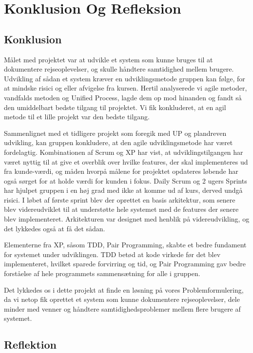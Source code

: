 \chapter{Konklusion Og Refleksion}\label{ch:KonklusionRefleksion}

\section{Konklusion}
Målet med projektet var at udvikle et system som kunne bruges til at dokumentere rejseoplevelser, og skulle håndtere samtidighed mellem brugere. Udvikling af sådan et system kræver en udviklingsmetode gruppen kan følge, for at mindske risici og eller afvigelse fra kursen. Hertil analyserede vi agile metoder, vandfalds metoden og Unified Process, lagde dem op mod hinanden og fandt så den umiddelbart bedste tilgang til projektet. Vi fik konkluderet, at en agil metode til et lille projekt var den bedste tilgang. 

Sammenlignet med et tidligere projekt som foregik med UP og plandreven udvikling, kan gruppen konkludere, at den agile udviklingsmetode har været fordelagtig. Kombinationen af Scrum og XP har vist, at udviklingstilgangen har været nyttig til at give et overblik over hvilke features, der skal implementeres ud fra kunde-værdi, og måden hvorpå målene for projektet opdateres løbende har også sørget for at holde værdi for kunden i fokus. Daily Scrum og 2 ugers Sprints har hjulpet gruppen i en høj grad med ikke at komme ud af kurs, derved undgå risici. 
I løbet af første sprint blev der oprettet en basis arkitektur, som senere blev videreudviklet til at understøtte hele systemet med de features der senere blev implementeret. Arkitekturen var designet med henblik på videreudvikling, og det lykkedes også at få det sådan.

Elementerne fra XP, såsom TDD, Pair Programming, skabte et bedre fundament for systemet under udviklingen. TDD betød at kode virkede før det blev implementeret, hvilket sparede forvirring og tid, og Pair Programming gav bedre forståelse af hele programmets sammensætning for alle i gruppen.

Det lykkedes os i dette projekt at finde en løsning på vores Problemformulering, da vi netop fik oprettet et system som kunne dokumentere rejseoplevelser, dele minder med venner og håndtere samtidighedsproblemer mellem flere brugere af systemet.

 
 


\section{Reflektion}
